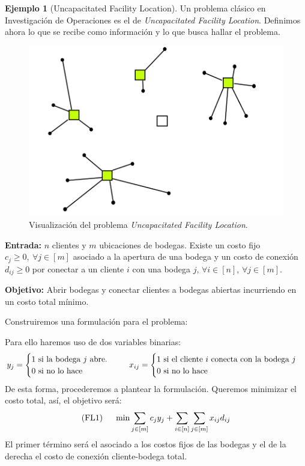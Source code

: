 \documentclass[10pt]{article}
\theoremstyle{plain}
\theoremstyle{definition}
\newtheorem{eje}{Ejemplo}
\begin{document}
\begin{eje}[Uncapacitated Facility Location] Un problema clásico en Investigación de Operaciones es el de \emph{Uncapacitated Facility Location}. Definimos ahora lo que se recibe como información y lo que busca hallar el problema.

\begin{figure}[H]
    \centering
    \includegraphics[scale=0.25]{UFL.png}
    \caption{Visualización del problema \textit{Uncapacitated Facility Location}.}
    \label{fig:UFL}
\end{figure}

\textbf{Entrada:} $n$ clientes y $m$ ubicaciones de bodegas. Existe un costo fijo $c_j\geq 0,\ \forall j\in [m]$ asociado a la apertura de una bodega y un costo de conexión $d_{ij}\geq 0$ por conectar a un cliente $i$ con una bodega $j$, $\forall i\in[n]$, $\forall j\in[m]$.

\textbf{Objetivo:} Abrir bodegas y conectar clientes a bodegas abiertas incurriendo en un costo total mínimo.

Construiremos una formulación para el problema:

Para ello haremos uso de dos variables binarias:
$$y_j=\begin{cases}1\text{ si la bodega }j\text{ abre.}\\
0\text{ si no lo hace}\end{cases}\hspace{0.5cm}x_{ij}=\begin{cases}1\text{ si el cliente } i\text{ conecta con la bodega }j\\
0\text{ si no lo hace}
\end{cases}$$
De esta forma, procederemos a plantear la formulación. Queremos minimizar el costo total, así, el objetivo será:
$$\text{(FL1)}\hspace{0.5cm}\min \sum_{j\in[m]}c_j y_j + \sum_{i\in [n]}\sum_{j\in[m]}x_{ij}d_{ij}$$
El primer término será el asociado a los costos fijos de las bodegas y el de la derecha el costo de conexión cliente-bodega total.


\end{eje}
\end{document}
